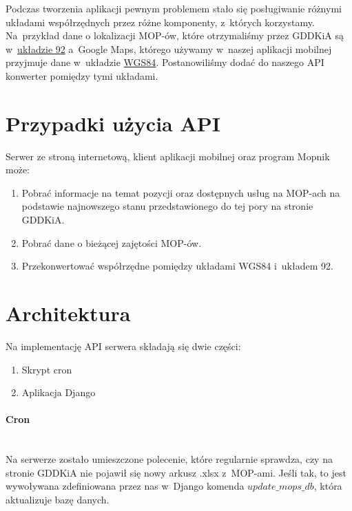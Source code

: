 Podczas tworzenia aplikacji pewnym problemem stało się posługiwanie różnymi układami współrzędnych przez różne komponenty, z~których korzystamy. Na~przykład dane o lokalizacji MOP-ów, które otrzymaliśmy przez GDDKiA są w~\href{https://pl.wikipedia.org/wiki/Uk\%C5\%82ad_wsp\%C3\%B3\%C5\%82rz\%C4\%99dnych_1992}{układzie 92}\cite{uklad-92} a~Google Maps, którego używamy w~naszej aplikacji mobilnej przyjmuje dane w~układzie \href{https://pl.wikipedia.org/wiki/System_odniesienia_WGS_84}{WGS84}. Postanowiliśmy dodać do naszego API konwerter pomiędzy tymi układami.
\section{Przypadki użycia API}
Serwer ze stroną internetową, klient aplikacji mobilnej oraz program Mopnik może:
\begin{enumerate}
\item Pobrać informacje na temat pozycji oraz dostępnych usług na MOP-ach na podstawie najnowszego stanu przedstawionego do tej pory na stronie GDDKiA.
\item Pobrać dane o bieżącej zajętości MOP-ów.
\item Przekonwertować współrzędne pomiędzy układami WGS84 i~układem 92.
\end{enumerate}
\section{Architektura}
Na implementację API serwera składają się dwie części:
\begin{enumerate}
\item Skrypt cron
\item Aplikacja Django
\end{enumerate}
\paragraph{Cron}\mbox{}\\
Na serwerze zostało umieszczone polecenie, które regularnie sprawdza, czy na stronie GDDKiA nie pojawił się nowy arkusz .xlsx z~MOP-ami. Jeśli tak, to jest wywoływana zdefiniowana przez nas w~Django komenda $\textit{update\_mops\_db}$, która aktualizuje bazę danych.
